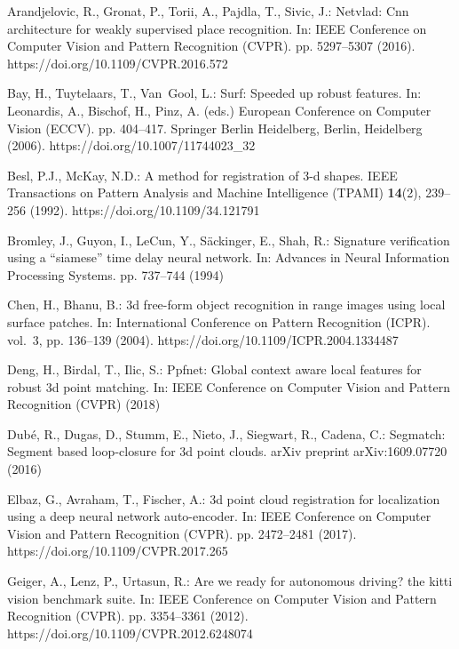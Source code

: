\documentclass[runningheads]{llncs}
\begin{document}
\clearpage


\begin{thebibliography}{10}
\providecommand{\url}[1]{\texttt{#1}}
\providecommand{\urlprefix}{URL }
\providecommand{\doi}[1]{https://doi.org/#1}

Arandjelovic, R., Gronat, P., Torii, A., Pajdla, T., Sivic, J.: Netvlad: Cnn
  architecture for weakly supervised place recognition. In: IEEE Conference on
  Computer Vision and Pattern Recognition (CVPR). pp. 5297--5307 (2016).
  \doi{10.1109/CVPR.2016.572}

Bay, H., Tuytelaars, T., Van~Gool, L.: Surf: Speeded up robust features. In:
  Leonardis, A., Bischof, H., Pinz, A. (eds.) European Conference on Computer
  Vision (ECCV). pp. 404--417. Springer Berlin Heidelberg, Berlin, Heidelberg
  (2006). \doi{10.1007/11744023_32}

Besl, P.J., McKay, N.D.: A method for registration of 3-d shapes. IEEE
  Transactions on Pattern Analysis and Machine Intelligence (TPAMI)
  \textbf{14}(2),  239--256 (1992). \doi{10.1109/34.121791}

Bromley, J., Guyon, I., LeCun, Y., S{\"a}ckinger, E., Shah, R.: Signature
  verification using a ``siamese'' time delay neural network. In: Advances in
  Neural Information Processing Systems. pp. 737--744 (1994)

Chen, H., Bhanu, B.: 3d free-form object recognition in range images using
  local surface patches. In: International Conference on Pattern Recognition
  (ICPR). vol.~3, pp. 136--139 (2004). \doi{10.1109/ICPR.2004.1334487}

Deng, H., Birdal, T., Ilic, S.: Ppfnet: Global context aware local features for
  robust 3d point matching. In: IEEE Conference on Computer Vision and Pattern
  Recognition (CVPR) (2018)

Dub{\'e}, R., Dugas, D., Stumm, E., Nieto, J., Siegwart, R., Cadena, C.:
  Segmatch: Segment based loop-closure for 3d point clouds. arXiv preprint
  arXiv:1609.07720  (2016)

Elbaz, G., Avraham, T., Fischer, A.: 3d point cloud registration for
  localization using a deep neural network auto-encoder. In: IEEE Conference on
  Computer Vision and Pattern Recognition (CVPR). pp. 2472--2481 (2017).
  \doi{10.1109/CVPR.2017.265}

Geiger, A., Lenz, P., Urtasun, R.: Are we ready for autonomous driving? the
  kitti vision benchmark suite. In: IEEE Conference on Computer Vision and
  Pattern Recognition (CVPR). pp. 3354--3361 (2012).
  \doi{10.1109/CVPR.2012.6248074}


\end{thebibliography}
\end{document}
